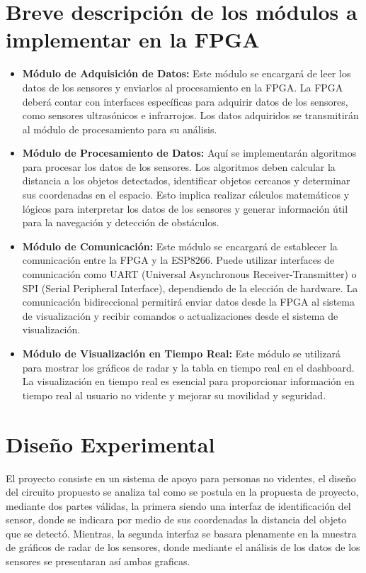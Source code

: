 \documentclass[osajnl,twocolumn,showpacs,superscriptaddress,10pt]{revtex4-1}
\begin{document}
\section{Breve descripción de los módulos a implementar en la FPGA}
\begin{itemize}
    \item \textbf{Módulo de Adquisición de Datos:} Este módulo se encargará de leer los datos de los sensores y enviarlos al procesamiento en la FPGA. La FPGA deberá contar con interfaces específicas para adquirir datos de los sensores, como sensores ultrasónicos e infrarrojos. Los datos adquiridos se transmitirán al módulo de procesamiento para su análisis.
    
    \item \textbf{Módulo de Procesamiento de Datos:} Aquí se implementarán algoritmos para procesar los datos de los sensores. Los algoritmos deben calcular la distancia a los objetos detectados, identificar objetos cercanos y determinar sus coordenadas en el espacio. Esto implica realizar cálculos matemáticos y lógicos para interpretar los datos de los sensores y generar información útil para la navegación y detección de obstáculos.
    
    \item \textbf{Módulo de Comunicación:} Este módulo se encargará de establecer la comunicación entre la FPGA y la ESP8266. Puede utilizar interfaces de comunicación como UART (Universal Asynchronous Receiver-Transmitter) o SPI (Serial Peripheral Interface), dependiendo de la elección de hardware. La comunicación bidireccional permitirá enviar datos desde la FPGA al sistema de visualización y recibir comandos o actualizaciones desde el sistema de visualización.
    
    \item \textbf{Módulo de Visualización en Tiempo Real:} Este módulo se utilizará para mostrar los gráficos de radar y la tabla en tiempo real en el dashboard. La visualización en tiempo real es esencial para proporcionar información en tiempo real al usuario no vidente y mejorar su movilidad y seguridad.
\end{itemize}
\section{Diseño Experimental}

El proyecto consiste en un sistema de apoyo para personas no videntes, el diseño del circuito propuesto se analiza tal como se postula en la propuesta de proyecto, mediante dos partes válidas, la primera siendo una interfaz de identificación del sensor, donde se indicara por medio de sus coordenadas la distancia del objeto que se detectó. Mientras, la segunda interfaz se basara plenamente en la muestra de gráficos de radar de los sensores, donde mediante el análisis de los datos de los sensores se presentaran así ambas graficas.\\
\end{document}
